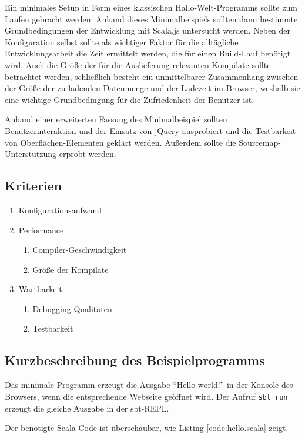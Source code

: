 \documentclass[a4paper, 12pt, hidelinks, listof=totoc, listoftables=totoc, bibliography=totoc]{scrreprt}
\newcommand{\code}[1]{\lstinline[language=Scala, style=inline]|#1|}
\begin{document}
Ein minimales Setup in Form eines klassischen Hallo-Welt-Programms sollte zum Laufen gebracht werden. Anhand dieses Minimalbeispiels sollten dann bestimmte Grundbedingungen der Entwicklung mit Scala.js untersucht werden. Neben der Konfiguration selbst sollte als wichtiger Faktor für die alltägliche Entwicklungsarbeit die Zeit ermittelt werden, die für einen Build-Lauf benötigt wird. Auch die Größe der für die Auslieferung relevanten Kompilate sollte betrachtet werden, schließlich besteht ein unmittelbarer Zusammenhang zwischen der Größe der zu ladenden Datenmenge und der Ladezeit im Browser, weshalb sie eine wichtige Grundbedingung für die Zufriedenheit der Benutzer ist.

Anhand einer erweiterten Fassung des Minimalbeispiel sollten Benutzerinteraktion und der Einsatz von jQuery ausprobiert und die Testbarkeit von Oberflächen-Elementen geklärt werden. Außerdem sollte die Sourcemap-Unterstützung erprobt werden.

\subsection{Kriterien}

\begin{enumerate}
	\item Konfigurationsaufwand
	\item Performance
	\begin{enumerate}
		\item Compiler-Geschwindigkeit
		\item Größe der Kompilate
	\end{enumerate}
	\item Wartbarkeit
		\begin{enumerate}
			\item Debugging-Qualitäten
			\item Testbarkeit
		\end{enumerate}
\end{enumerate}

\subsection{Kurzbeschreibung des Beispielprogramms}

Das minimale Programm erzeugt die Ausgabe "`Hello world!"' in der Konsole des Browsers, wenn die entsprechende Webseite geöffnet wird. Der Aufruf \code{sbt run} erzeugt die gleiche Ausgabe in der sbt-REPL.

Der benötigte Scala-Code ist überschaubar, wie Listing \ref{code:hello.scala} zeigt.
\end{document}
